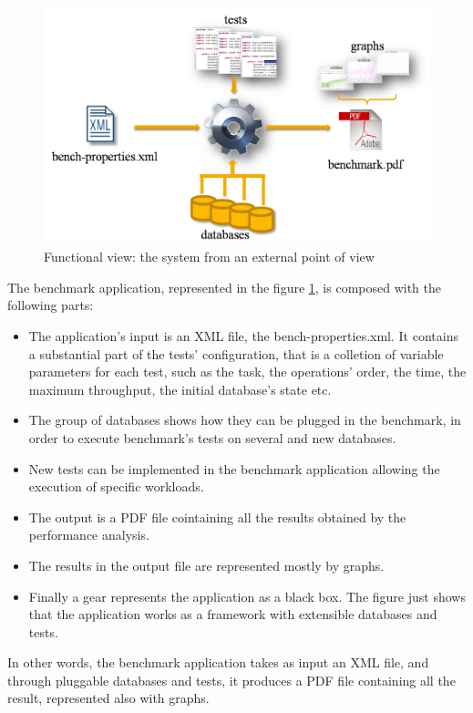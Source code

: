 \begin{figure}[htp!] 
	\begin{center}
		\includegraphics[width=13cm]{img/diagramma-specifiche.png}	
	\end{center}
	\caption{Functional view: the system from an external point of view}
	\label{system-external-view}	
\end{figure}

The benchmark application, represented in the figure \ref{system-external-view}, is composed with the following parts:
\begin{itemize}
	\item The application's input is an XML file, the bench-properties.xml. It contains a substantial part of the tests' configuration, that is a colletion of variable parameters for each test, such as the task, the operations' order, the time, the maximum throughput, the initial database's state etc.
	\item The group of databases shows how they can be plugged in the benchmark, in order to execute benchmark's tests on several and new databases.
	\item New tests can be implemented in the benchmark application allowing the execution of specific workloads. 
	\item The output is a PDF file cointaining all the results obtained by the performance analysis.
	\item The results in the output file are represented mostly by graphs.
	\item Finally a gear represents the application as a black box. The figure just shows that the application works as a framework with extensible databases and tests.
\end{itemize}
In other words, the benchmark application takes as input an XML file, and through pluggable databases and tests, it produces a PDF file containing all the result, represented also with graphs.


